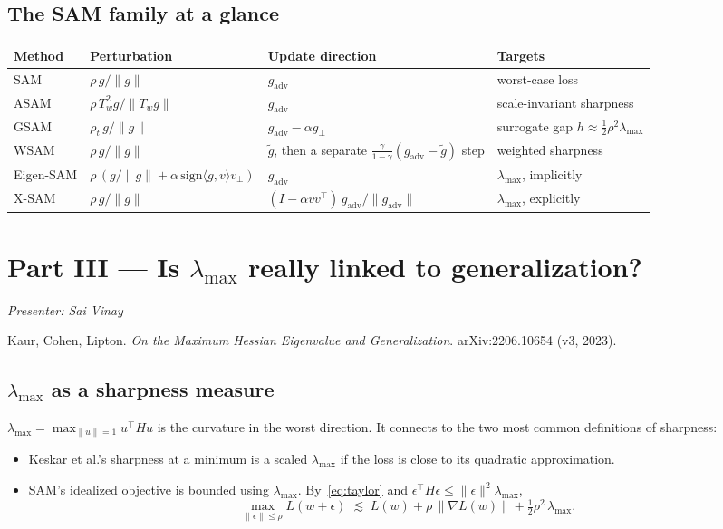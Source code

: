 \documentclass[11pt]{article}
\newcommand{\lmax}{\lambda_{\max}}
\newcommand{\gp}{g_{\mathrm{adv}}}
\newcommand{\presenter}[1]{\noindent\textit{Presenter: #1}\par\medskip}
\theoremstyle{plain}
\begin{document}
\subsection{The SAM family at a glance}

\begin{center}\small
\begin{tabularx}{\textwidth}{@{}p{2.2cm}p{4.6cm}Lp{2.2cm}@{}}
\toprule
\textbf{Method} & \textbf{Perturbation} & \textbf{Update direction} & \textbf{Targets} \\
\midrule
SAM       & $\rho\, g/\|g\|$ & $\gp$ & worst-case loss \\
ASAM      & $\rho\, T_w^2 g/\|T_w g\|$ & $\gp$ & scale-invariant sharpness \\
GSAM      & $\rho_t\, g/\|g\|$ & $\gp - \alpha g_\perp$ & surrogate gap $h \approx \frac12\rho^2\lmax$ \\
WSAM      & $\rho\, g/\|g\|$ & $\tilde g$, then a separate $\frac{\gamma}{1-\gamma}(\gp - \tilde g)$ step & weighted sharpness \\
Eigen-SAM & $\rho\,(g/\|g\| + \alpha\,\mathrm{sign}\langle g,v\rangle v_\perp)$ & $\gp$ & $\lmax$, implicitly \\
X-SAM     & $\rho\, g/\|g\|$ & $(I - \alpha vv^\top)\,\gp/\|\gp\|$ & $\lmax$, explicitly \\
\bottomrule
\end{tabularx}
\end{center}

\section{Part III --- Is $\lmax$ really linked to generalization?}
\label{sec:kaur}
\presenter{Sai Vinay}

Kaur, Cohen, Lipton. \emph{On the Maximum Hessian Eigenvalue and Generalization}. arXiv:2206.10654 (v3, 2023).

\subsection{$\lmax$ as a sharpness measure}

$\lmax = \max_{\|u\|=1} u^\top H u$ is the curvature in the worst direction. It connects to the two most common definitions of sharpness:
\begin{itemize}
  \item Keskar et al.'s sharpness at a minimum is a scaled $\lmax$ if the loss is close to its quadratic approximation.
  \item SAM's idealized objective is bounded using $\lmax$. By~\eqref{eq:taylor} and $\epsilon^\top H\epsilon \le \|\epsilon\|^2\lmax$,
  \begin{equation}
    \max_{\|\epsilon\|\le\rho} L(w+\epsilon) \;\lesssim\; L(w) + \rho\,\|\nabla L(w)\| + \tfrac12\rho^2\,\lmax .
  \end{equation}
\end{itemize}
\end{document}
